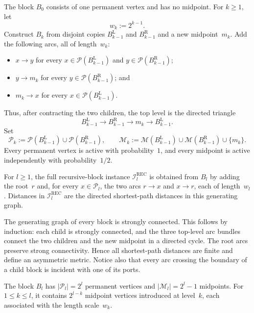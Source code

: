 \documentclass[12pt,a4paper,oneside]{report}
\begin{document}
The block $B_0$ consists of one permanent vertex and has no midpoint.  For
$k\ge1$, let
\[
    w_k:=2^{k-1}.
\]
Construct $B_k$ from disjoint copies $B_{k-1}^{\mathrm L}$ and
$B_{k-1}^{\mathrm R}$ and a new midpoint~$m_k$.  Add the following arcs,
all of length~$w_k$:
\begin{itemize}
    \item $x\to y$ for every
    $x\in\mathcal P(B_{k-1}^{\mathrm L})$ and
    $y\in\mathcal P(B_{k-1}^{\mathrm R})$;
    \item $y\to m_k$ for every
    $y\in\mathcal P(B_{k-1}^{\mathrm R})$; and
    \item $m_k\to x$ for every
    $x\in\mathcal P(B_{k-1}^{\mathrm L})$.
\end{itemize}
Thus, after contracting the two children, the top level is the directed
triangle
\[
    B_{k-1}^{\mathrm L}
    \longrightarrow
    B_{k-1}^{\mathrm R}
    \longrightarrow
    m_k
    \longrightarrow
    B_{k-1}^{\mathrm L}.
\]
Set
\[
    \mathcal P_k
    :=
    \mathcal P(B_{k-1}^{\mathrm L})
    \cup
    \mathcal P(B_{k-1}^{\mathrm R}),
    \qquad
    \mathcal M_k
    :=
    \mathcal M(B_{k-1}^{\mathrm L})
    \cup
    \mathcal M(B_{k-1}^{\mathrm R})
    \cup\{m_k\}.
\]
Every permanent vertex is active with probability~$1$, and every midpoint is
active independently with probability~$1/2$.

For $l\ge1$, the full recursive-block instance
$\mathcal{I}_l^{\mathrm{REC}}$ is obtained from $B_l$ by adding the
root~$r$ and, for every $x\in\mathcal P_l$, the two arcs $r\to x$ and
$x\to r$, each of length~$w_l$.  Distances in
$\mathcal{I}_l^{\mathrm{REC}}$ are the directed shortest-path distances in
this generating graph.

The generating graph of every block is strongly connected.  This follows by
induction: each child is strongly connected, and the three top-level arc
bundles connect the two children and the new midpoint in a directed cycle.
The root arcs preserve strong connectivity.  Hence all shortest-path
distances are finite and define an asymmetric metric.  Notice also that every arc
crossing the boundary of a child block is incident with one of its ports.

The block $B_l$ has $|\mathcal P_l|=2^l$ permanent vertices and
$|\mathcal M_l|=2^l-1$ midpoints.  For $1\le k\le l$, it contains
$2^{l-k}$ midpoint vertices introduced at level~$k$, each associated with
the length scale~$w_k$.
\end{document}
